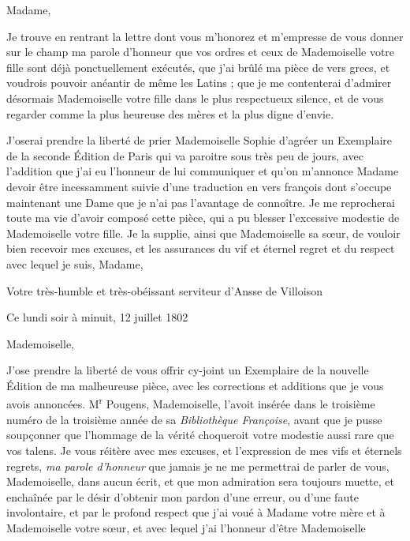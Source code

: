 \documentclass[11pt,a4paper]{article}
\begin{document}

Madame,

Je trouve en rentrant la lettre dont vous m'honorez et m'empresse de vous
donner sur le champ ma parole d'honneur que vos ordres et ceux de Mademoiselle
votre fille sont déjà ponctuellement exécutés, que j'ai brûlé ma pièce de vers
grecs, et voudrois pouvoir anéantir de même les Latins ; que je me contenterai
d'admirer désormais Mademoiselle votre fille dans le plus respectueux silence,
et de vous regarder comme la plus heureuse des mères et la plus digne d'envie.

J'oserai prendre la liberté de prier Mademoiselle Sophie d'agréer un Exemplaire
de la seconde Édition de Paris qui va paroitre sous très peu de jours, avec
l'addition que j'ai eu l'honneur de lui communiquer et qu'on m'annonce Madame
devoir être incessamment suivie d'une traduction en vers françois dont s'occupe
maintenant une Dame que je n'ai pas l'avantage de connoître. Je me reprocherai
toute ma vie d'avoir composé cette pièce, qui a pu blesser l'excessive modestie
de Mademoiselle votre fille. Je la supplie, ainsi que Mademoiselle sa sœur, de
vouloir bien recevoir mes excuses, et les assurances du vif et éternel regret
et du respect avec lequel je suis, Madame,

Votre très-humble et très-obéissant serviteur d'Ansse de Villoison

Ce lundi soir à minuit, 12 juillet 1802


Mademoiselle,

J'ose prendre la liberté de vous offrir cy-joint un Exemplaire de la nouvelle
Édition de ma malheureuse pièce, avec les corrections et additions que je vous
avois annoncées. M\textsuperscript{r} Pougens, Mademoiselle, l'avoit insérée
dans le troisième numéro de la troisième année de sa \emph{Bibliothèque
Françoise}, avant que je pusse soupçonner que l'hommage de la vérité
choqueroit votre modestie aussi rare que vos talens. Je vous réitère avec mes
excuses, et  l'expression de mes vifs et éternels regrets,
\emph{ma parole d'honneur} que jamais je ne me permettrai de parler de vous,
Mademoiselle, dans aucun écrit, et que mon admiration sera toujours muette, et
enchaînée par le désir d'obtenir mon pardon d'une erreur, ou d'une faute
involontaire, et par le profond respect que j'ai voué à Madame votre mère et à
Mademoiselle votre sœur, et avec lequel j'ai l'honneur d'être Mademoiselle
\end{document}
